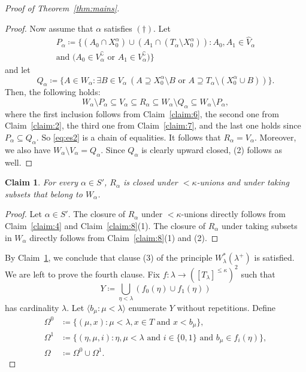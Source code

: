 \documentclass[]{amsart}
\newtheorem{claim}{Claim}[theorem]
\theoremstyle{definition}
\theoremstyle{remark}
\begin{document}
\begin{proof}[Proof of Theorem~\ref{thm:mains}]
\begin{proof}
Now assume that $\alpha$ satisfies $(\dagger)$. Let
\begin{multline*}
P_\alpha \coloneqq \big\{(A_0 \cap X^\alpha_0) \cup (A_1 \cap (T_\alpha \setminus X^\alpha_0)) : A_0, A_1 \in \hat{V}_\alpha\\\text{and } \big(A_0 \in V_\alpha^\complement \text{ or } A_1 \in V_\alpha^\complement\big)\big\}
\end{multline*}
and let 
\[
Q_\alpha \coloneqq \big\{A \in W_\alpha : \exists B \in V_\alpha \ (A \supseteq X^\alpha_0 \setminus B \text{ or } A \supseteq T_\alpha \setminus (X^\alpha_0 \cup B))\big\}.
\]
Then, the following holds:
\begin{equation}\label{eq:es2}
W_\alpha \setminus P_\alpha \subseteq V_\alpha \subseteq R_\alpha \subseteq W_\alpha \setminus Q_\alpha \subseteq W_\alpha \setminus P_\alpha,
\end{equation}
where the first inclusion follows from Claim~\ref{claim:6}, the second one from Claim~\ref{claim:2}, the third one from Claim~\ref{claim:7}, and the last one holds since $P_\alpha \subseteq Q_\alpha$. So \eqref{eq:es2} is a chain of equalities. It follows that $R_\alpha = V_\alpha$. Moreover, we also have $W_\alpha \setminus V_\alpha = Q_\alpha$. Since $Q_\alpha$ is clearly upward closed, (2) follows as well.
\end{proof}

\begin{claim}\label{claim:9}
For every $\alpha \in S'$, $R_\alpha$ is closed under ${<}\kappa$-unions and under taking subsets that belong to $W_\alpha$.
\end{claim}
\begin{proof}
Let $\alpha \in S'$.  The closure of $R_\alpha$ under ${<}\kappa$-unions directly follows from  Claim~\ref{claim:4} and Claim~\ref{claim:8}(1). The closure of $R_\alpha$ under taking subsets in $W_\alpha$ directly follows from Claim~\ref{claim:8}(1) and (2).
\end{proof}

By Claim~\ref{claim:9}, we conclude that clause (3) of the principle $W^*_\lambda(\lambda^+)$ is satisfied. We are left to prove the fourth clause.  Fix $f:\lambda \rightarrow ([T_{\lambda}]^{\le\kappa})^2$ such that 
\[
Y \coloneqq \bigcup_{\eta < \lambda} (f_0(\eta) \cup f_1(\eta))
\] 
has cardinality $\lambda$. Let $\langle b_\mu : \mu < \lambda\rangle$ enumerate $Y$ without repetitions. Define
\begin{align*}
\Omega^0 &\coloneqq \{(\mu, x) : \mu < \lambda, x \in T \text{ and } x < b_\mu\},\\
\Omega^1 &\coloneqq \{(\eta, \mu, i) : \eta,\mu < \lambda \text{ and } i \in \{0,1\} \text{ and } b_\mu \in f_i(\eta)\},\\
\Omega &\coloneqq \Omega^0 \cup \Omega^1.
\end{align*}


\end{proof}
\end{document}
